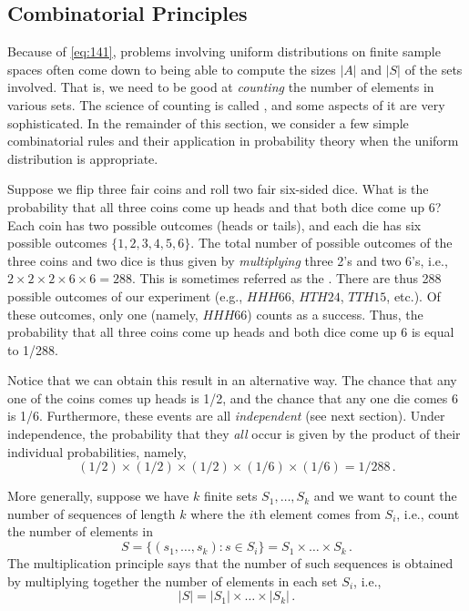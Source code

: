 \subsection{Combinatorial Principles}
Because of \autoref{eq:141}, problems involving uniform distributions on finite sample spaces often come down to
being able to compute the sizes $|A|$ and $|S|$ of the sets involved. That is, we need to be good at \emph{counting}
the number of elements in various sets. The science of counting is called , and some aspects of
it are very sophisticated. In the remainder of this section, we consider a few simple combinatorial rules and their
application in probability theory when the uniform distribution is appropriate.

\begin{example}
    Suppose we flip three fair coins and roll two fair six-sided dice. What is the probability that all three coins
    come up heads and that both dice come up 6? Each coin has two possible outcomes (heads or tails), and each die
    has six  possible outcomes $\{1,2,3,4,5,6\}$. The total number of possible outcomes of the three coins and two
    dice is thus given by \emph{multiplying} three 2's and two 6's, i.e., $2\times2\times2\times6\times6=288$. This is
    sometimes referred as the . There are thus 288 possible outcomes of our experiment
    (e.g., $HHH66$, $HTH24$, $TTH15$, etc.). Of these outcomes, only one (namely, $HHH66$) counts as a success. Thus,
    the probability that all three coins come up heads and both dice come up 6 is equal to 1/288.

    Notice that we can obtain this result in an alternative way. The chance that any one of the coins comes up heads
    is 1/2, and the chance that any one die comes 6 is 1/6. Furthermore, these events are all \emph{independent} (see
    next section). Under independence, the probability that they \emph{all} occur is given by the product of their
    individual probabilities, namely,
    $$
    (1/2)\times(1/2)\times(1/2)\times(1/6)\times(1/6)=1/288\,.
    $$

    More generally, suppose we have $k$ finite sets $S_1,\dots,S_k$ and we want to count the number of sequences of
    length $k$ where the $i$th element comes from $S_i$, i.e., count the number of elements in
    $$
    S = \{(s_1,\dots,s_k) : s \in S_i\} = S_1 \times \dots \times S_k\,.
    $$
    The multiplication principle says that the number of such sequences is obtained by multiplying together the
    number of elements in each set $S_i$, i.e.,
    $$
        |S| = |S_1|\times\dots\times|S_k|\,.
    $$
\end{example}

